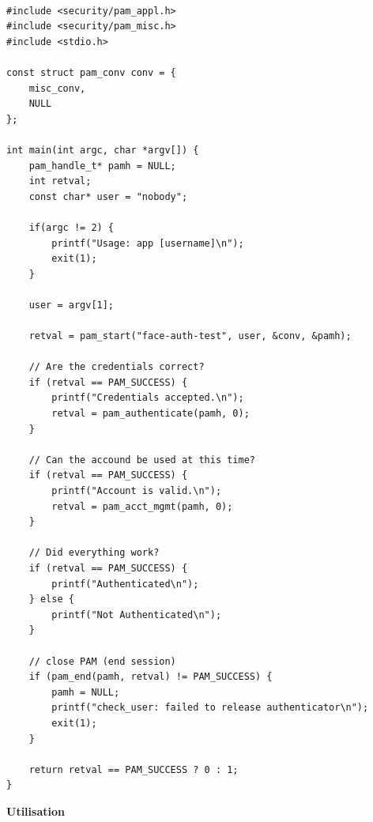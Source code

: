 \documentclass[french]{report}
\begin{document}
\begin{itemize}[label=\textbullet, font=\normalfont \color{blue}]
  \begin{verbatim}

#include <security/pam_appl.h>
#include <security/pam_misc.h>
#include <stdio.h>

const struct pam_conv conv = {
	misc_conv,
	NULL
};

int main(int argc, char *argv[]) {
	pam_handle_t* pamh = NULL;
	int retval;
	const char* user = "nobody";

	if(argc != 2) {
		printf("Usage: app [username]\n");
		exit(1);
	}

	user = argv[1];

	retval = pam_start("face-auth-test", user, &conv, &pamh);

	// Are the credentials correct?
	if (retval == PAM_SUCCESS) {
		printf("Credentials accepted.\n");
		retval = pam_authenticate(pamh, 0);
	}

	// Can the accound be used at this time?
	if (retval == PAM_SUCCESS) {
		printf("Account is valid.\n");
		retval = pam_acct_mgmt(pamh, 0);
	}

	// Did everything work?
	if (retval == PAM_SUCCESS) {
		printf("Authenticated\n");
	} else {
		printf("Not Authenticated\n");
	}

	// close PAM (end session)
	if (pam_end(pamh, retval) != PAM_SUCCESS) {
		pamh = NULL;
		printf("check_user: failed to release authenticator\n");
		exit(1);
	}

	return retval == PAM_SUCCESS ? 0 : 1;
}
    \end{verbatim}
  \end{itemize}

  \vspace{0.5cm}

  \textbf{Utilisation}\\
\end{document}
